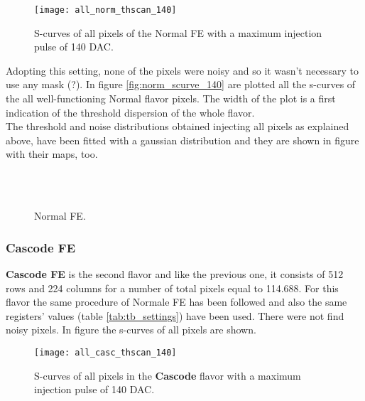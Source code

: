 \begin{figure}[h!]
\centering
\texttt{[image: all\_norm\_thscan\_140]}
\caption{S-curves of all pixels of the Normal FE with a maximum injection pulse of 140 DAC.}
\label{fig:norm_scurve_140}
\end{figure}

Adopting this setting, none of the pixels were noisy and so it wasn't necessary to use any mask (?).
In figure \vref{fig:norm_scurve_140} are plotted all the s-curves of the all well-functioning Normal flavor pixels. The width of the plot is a first indication of the threshold dispersion of the whole flavor.\\

The threshold and noise distributions obtained injecting all pixels as explained above, have been fitted with a gaussian distribution and they are shown in figure  with their maps, too.

\begin{figure}[h!]
\centering
{}\quad
{}\\
\quad
{}\\
\caption{Normal FE.}
\label{fig:thdist_norm}
\end{figure}



\subsubsection{Cascode FE}

\textbf{Cascode FE} is the second flavor and like the previous one, it consists of 512 rows and 224 columns for a number of total pixels equal to 114.688. For this flavor the same procedure of Normale FE has been followed and also the same registers' values (table \vref{tab:tb_settings}) have been used. There were not find noisy pixels. 
In figure  the s-curves of all pixels are shown.

\begin{figure}[h!]
\centering
\texttt{[image: all\_casc\_thscan\_140]}
\caption{S-curves of all pixels in the \textbf{Cascode} flavor with a maximum injection pulse of 140 DAC.}
\label{fig:casc_scurve140}
\end{figure}

